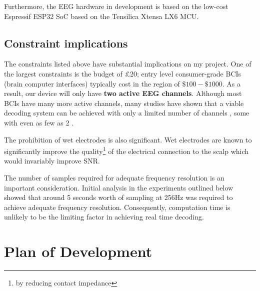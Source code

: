 Furthermore, the EEG hardware in development is based on the low-cost Espressif ESP32 SoC based on the Tensilica Xtensa LX6 MCU. 

\subsection{Constraint implications}
The constraints listed above have substantial implications on my project. One of the largest constraints is the budget of £20; entry level consumer-grade BCIs (brain computer interfaces) typically cost in the region of $\$100-\$1000$. As a result, our device will only have \textbf{two active EEG channels}. Although most BCIs have many more active channels, many studies have shown that a viable decoding system can be achieved with only a limited number of channels \cite{Wang2011}, some with even as few as 2 \cite{Acampora2021}. 

The prohibition of wet electrodes is also significant. Wet electrodes are known to significantly improve the quality\footnote{by reducing contact impedance} of the electrical connection to the scalp which would invariably improve SNR. 

The number of samples required for adequate frequency resolution is an important consideration. Initial analysis in the experiments outlined below showed that around 5 seconds worth of sampling at 256Hz was required to achieve adequate frequency resolution. Consequently, computation time is unlikely to be the limiting factor in achieving real time decoding.

\section{Plan of Development}
